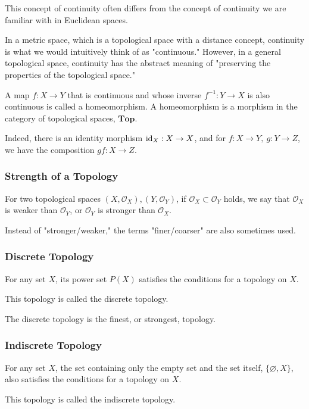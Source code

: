 \documentclass{article}
\begin{document}
This concept of continuity often differs from the concept of continuity we are familiar with in Euclidean spaces.

In a metric space, which is a topological space with a distance concept, continuity is what we would intuitively think of as "continuous." However, in a general topological space, continuity has the abstract meaning of "preserving the properties of the topological space."

A map $f: X \to Y$ that is continuous and whose inverse $f^{-1}: Y \to X$ is also continuous is called a homeomorphism.
A homeomorphism is a morphism in the category of topological spaces, $\mathbf{Top}$.

Indeed, there is an identity morphism ${\rm id}_{X}: X \to X$, and for $f: X \to Y, \ g: Y \to Z$, we have the composition $g f : X \to Z$.


\subsubsection{Strength of a Topology}

For two topological spaces $(X, {\mathcal O}_{X}), (Y, {\mathcal O}_{Y})$, if
${\mathcal O}_{X} \subset {\mathcal O}_{Y}$
holds, we say that
${\mathcal O}_{X}$ is weaker than ${\mathcal O}_{Y}$,
or ${\mathcal O}_{Y}$ is stronger than ${\mathcal O}_{X}$.

Instead of "stronger/weaker," the terms "finer/coarser" are also sometimes used.


\subsubsection{Discrete Topology}

For any set $X$, its power set $P(X)$ satisfies the conditions for a topology on $X$.

This topology is called the discrete topology.

The discrete topology is the finest, or strongest, topology.


\subsubsection{Indiscrete Topology}

For any set $X$, the set containing only the empty set and the set itself, $\{ \varnothing, X \}$, also satisfies the conditions for a topology on $X$.

This topology is called the indiscrete topology.
\end{document}
